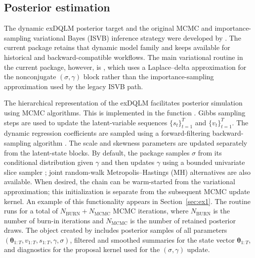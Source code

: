 \documentclass{jss}
\newcommand{\vect}[1]{\boldsymbol{#1}}
\begin{document}
\subsection{Posterior estimation}

The dynamic exDQLM posterior target and the original MCMC and importance-sampling variational Bayes (ISVB) inference strategy were developed by \citet{me}. The current package retains that dynamic model family and keeps  available for historical and backward-compatible workflows. The main variational routine in the current package, however, is , which uses a Laplace--delta approximation for the nonconjugate $(\sigma,\gamma)$ block rather than the importance-sampling approximation used by the legacy ISVB path.

The hierarchical representation of the exDQLM facilitates posterior simulation using MCMC algorithms. This is implemented in the function .
Gibbs sampling steps are used to update the latent-variable sequences
$\{s_t\}_{t=1}^T$ and $\{v_t\}_{t=1}^T$. The dynamic regression
coefficients are sampled using a forward-filtering
backward-sampling algorithm \citep{carter1994gibbs,fruhwirth1994data}.
The scale and skewness parameters are updated separately from the
latent-state blocks. By default, the package samples $\sigma$ from its
conditional distribution given $\gamma$ and then updates $\gamma$ using a
bounded univariate slice sampler \citep{neal2003slice}; joint
random-walk Metropolis--Hastings (MH) alternatives are also available.
When desired, the chain can be warm-started from the variational
approximation; this initialization is separate from the subsequent MCMC
update kernel. An example of this functionality appears in
Section~\ref{sec:ex1}. The routine runs for a total of
$N_{\mathrm{BURN}} + N_{\mathrm{MCMC}}$ MCMC iterations, where
$N_{\mathrm{BURN}}$ is the number of burn-in iterations and
$N_{\mathrm{MCMC}}$ is the number of retained posterior draws. The object
created by  includes posterior samples of all
parameters
$(\vect{\theta}_{1:T}, v_{1:T}, s_{1:T}, \gamma, \sigma)$, filtered and
smoothed summaries for the state vector $\vect{\theta}_{1:T}$, and
diagnostics for the proposal kernel used for the $(\sigma,\gamma)$ update.
\end{document}
